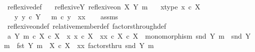 \begin{isabellebody}
\isanewline
{}\isamarkupfalse%
\ reflexive{\isacharunderscore}{\kern0pt}def{}{\isacharcolon}{\kern0pt}\isanewline
\ \ \ reflexive{\isacharunderscore}{\kern0pt}Y{\isacharcolon}{\kern0pt}\ {\isachardoublequoteopen}reflexive{\isacharunderscore}{\kern0pt}on\ X\ {\isacharparenleft}{\kern0pt}Y{\isacharcomma}{\kern0pt}\ m{\isacharparenright}{\kern0pt}{\isachardoublequoteclose}\isanewline
\ \ \ x{\isacharunderscore}{\kern0pt}type{\isacharcolon}{\kern0pt}\ {\isachardoublequoteopen}x\ {\isasymin}\isactrlsub c\ X{\isachardoublequoteclose}\ \isanewline
\ \ \ {\isachardoublequoteopen}{\isasymexists}y{\isachardot}{\kern0pt}\ y\ {\isasymin}\isactrlsub c\ Y\ {\isasymand}\ \ m\ {\isasymcirc}\isactrlsub c\ y\ {\isacharequal}{\kern0pt}\ {\isasymlangle}x{\isacharcomma}{\kern0pt}x{\isasymrangle}{\isachardoublequoteclose}\isanewline
%
\isadelimproof
\ \ %
\endisadelimproof
%
\isatagproof
{}\isamarkupfalse%
\ assms\ \isamarkupfalse%
\ reflexive{\isacharunderscore}{\kern0pt}on{\isacharunderscore}{\kern0pt}def\ relative{\isacharunderscore}{\kern0pt}member{\isacharunderscore}{\kern0pt}def\ factors{\isacharunderscore}{\kern0pt}through{\isacharunderscore}{\kern0pt}def{}\isanewline
{}\isamarkupfalse%
\ {\isacharminus}{\kern0pt}\isanewline
\ \ \ \ \isamarkupfalse%
\ a{}{\isacharcolon}{\kern0pt}\ {\isachardoublequoteopen}{\isacharparenleft}{\kern0pt}Y{\isacharcomma}{\kern0pt}\ m{\isacharparenright}{\kern0pt}\ {\isasymsubseteq}\isactrlsub c\ X\ {\isasymtimes}\isactrlsub c\ X\ {\isasymand}\ {\isacharparenleft}{\kern0pt}{\isasymforall}x{\isachardot}{\kern0pt}\ x\ {\isasymin}\isactrlsub c\ X\ {\isasymlongrightarrow}\ {\isasymlangle}x{\isacharcomma}{\kern0pt}x{\isasymrangle}\ {\isasymin}\isactrlsub c\ X\ {\isasymtimes}\isactrlsub c\ X\ {\isasymand}\ monomorphism\ {\isacharparenleft}{\kern0pt}snd\ {\isacharparenleft}{\kern0pt}Y{\isacharcomma}{\kern0pt}\ m{\isacharparenright}{\kern0pt}{\isacharparenright}{\kern0pt}\ {\isasymand}\ snd\ {\isacharparenleft}{\kern0pt}Y{\isacharcomma}{\kern0pt}\ m{\isacharparenright}{\kern0pt}\ {\isacharcolon}{\kern0pt}\ fst\ {\isacharparenleft}{\kern0pt}Y{\isacharcomma}{\kern0pt}\ m{\isacharparenright}{\kern0pt}\ {\isasymrightarrow}\ X\ {\isasymtimes}\isactrlsub c\ X\ {\isasymand}\ {\isasymlangle}x{\isacharcomma}{\kern0pt}x{\isasymrangle}\ factorsthru\ snd\ {\isacharparenleft}{\kern0pt}Y{\isacharcomma}{\kern0pt}\ m{\isacharparenright}{\kern0pt}{\isacharparenright}{\kern0pt}{\isachardoublequoteclose}\isanewline

\end{isabellebody}
